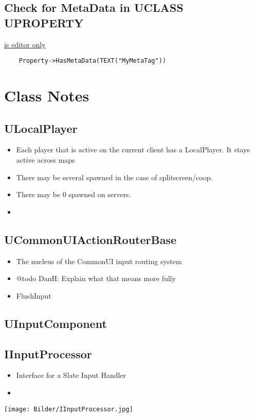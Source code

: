     \subsection{Check for MetaData in UCLASS UPROPERTY}
        \uline{is editor only}
        \begin{lstlisting}
    Property->HasMetaData(TEXT("MyMetaTag"))
        \end{lstlisting}


    \section{Class Notes}
        \subsection{ULocalPlayer}
            \begin{itemize}
                \item  Each player that is active on the current client has a LocalPlayer. It stays active across maps
                \item  There may be several spawned in the case of splitscreen/coop.
                \item  There may be 0 spawned on servers.
                \item 
            \end{itemize}


        \subsection{UCommonUIActionRouterBase}
            \begin{itemize}
                \item The nucleus of the CommonUI input routing system
                \item @todo DanH: Explain what that means more fully 
                \item FlushInput
            \end{itemize}

        \subsection{UInputComponent}

        \subsection{IInputProcessor}
            \begin{itemize}
                \item Interface for a Slate Input Handler
                \item 
            \end{itemize}
             \texttt{[image: Bilder/IInputProcessor.jpg]}

